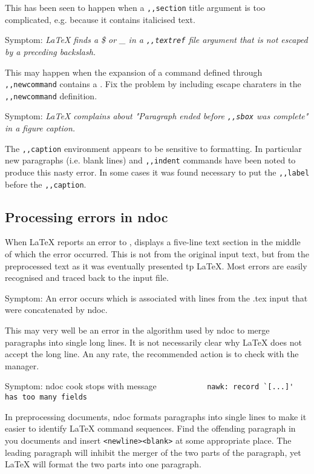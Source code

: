         This has been seen to happen when a \verb/,,section/ title argument is
too complicated, e.g. because it contains italicised text. 

\item   Symptom: 
        {\em LaTeX finds a \$ or \_ in a \verb/,,textref/ file argument that is
not escaped by a preceding backslash.} 

        This may happen when the expansion of a command defined through 
\verb/,,newcommand/ contains a . Fix
the problem by including escape charaters in the \verb/,,newcommand/
definition. 

\item   Symptom: 
        {\em LaTeX complains about "Paragraph ended before \verb/,,sbox/ was
complete" in a figure caption.} 

        The \verb/,,caption/ environment appears to be sensitive to formatting.
In particular new paragraphs (i.e. blank lines) and \verb/,,indent/ commands
have been noted to produce this nasty error. In some cases it was found
necessary to put the \verb/,,label/ before the \verb/,,caption/. 
\ei 


\subsection{ Processing errors in ndoc} 

        When LaTeX reports an error to \ndoc, \ndoc displays a five-line text
section in the middle of which the error occurred. This is not from the
original input text, but from the preprocessed text as it was eventually
presented tp LaTeX. Most errors are easily recognised and traced back to the
input \tex file. 

\bi 
\item   Symptom: 
        An error occurs which is associated with lines from the .tex input that
were concatenated by ndoc. 

        This may very well be an error in the algorithm used by ndoc to merge
paragraphs into single long lines. It is not necessarily clear why LaTeX does
not accept the long line. An any rate, the recommended action is to check with
the \NEWSTAR manager. 

\item   Symptom: 
        ndoc cook stops with message 
\verb/           nawk: record `[...]' has too many fields/ 

        In preprocessing documents, ndoc formats paragraphs into single lines
to make it easier to identify LaTeX command sequences. Find the offending
paragraph in you documents and insert \verb/<newline><blank>/ at some
appropriate place. The leading paragraph will inhibit the merger of the two
parts of the paragraph, yet LaTeX will format the two parts into one paragraph.
 
